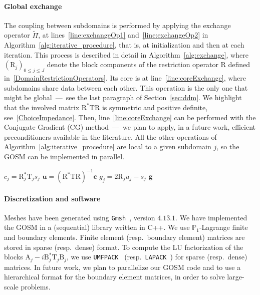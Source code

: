 \documentclass[a4paper,11pt]{article}
\newcommand{\mA}{\mathrm{A}}
\newcommand{\mB}{\mathrm{B}}
\newcommand{\mT}{\mathrm{T}}
\newcommand{\mR}{\mathrm{R}}
\newcommand{\bu}{\boldsymbol{u}}
\newcommand{\bg}{\boldsymbol{g}}
\newcommand{\bs}{\boldsymbol{s}}
\newcommand{\bc}{\boldsymbol{c}}
\begin{document}
\paragraph{Global exchange}

The coupling between subdomains is performed by applying the exchange operator \(\tilde{\Pi}\), at lines~\ref{line:exchangeOp1} and~\ref{line:exchangeOp2} in Algorithm~\ref{alg:iterative_procedure}, that is, at initialization and then at each iteration. This process is described in detail in Algorithm~\ref{alg:exchange}, where \((\mR_j)_{0\le j \le J}\) denote the block components of the restriction operator \(\mR\) defined in~\eqref{DomainRestrictionOperators}. 
Its core is at line~\ref{line:coreExchange}, where subdomains share data between each other. This operation is the only one that might be global~---~see the last paragraph of Section~\ref{sec:ddm}. We highlight that the involved matrix \(\mR^* \mT \mR\) is symmetric and positive definite, see~\eqref{ChoiceImpedance}. Then, line~\ref{line:coreExchange} can be performed with the Conjugate Gradient (CG) method~---~we plan to apply, in a future work, efficient preconditioners available in the literature.
All the other operations of Algorithm~\ref{alg:iterative_procedure} are local to a given subdomain \(j\), so the GOSM can be implemented in parallel. 

\begin{algorithm}[H]
  \caption{Apply \(\tilde{\Pi}\) to a vector \(\bs\)}\label{alg:exchange}
  \begin{algorithmic}[1]
      \State \(c_j = \mR_j^* \mT_j s_j \) 
    \EndFor
    \State \(\bu = \left(\mR^* \mT \mR\right)^{-1} \bc\) \label{line:coreExchange}
      \State \(g_j = 2 \mR_j u_j - s_j\) 
    \EndFor
    \State \Return \(\bg\)
  \end{algorithmic}
\end{algorithm}



\paragraph{Discretization and software}
Meshes have been generated using \texttt{Gmsh}~\cite{GeuzaineRemacle2009G3F}, version \(4.13.1\). We have implemented the GOSM in a (sequential) library written in C++. 
We use $\mathbb{P}_1$-Lagrange finite and boundary elements. Finite element (resp.~boundary element) matrices are stored in sparse (resp.~dense) format. 
To compute the LU factorization of the blocks \(\mA_j -i \mB_j^* \mT_j \mB_j\), we use \texttt{UMFPACK}~\cite{Davis2004A8U} (resp.~\texttt{LAPACK}~\cite{Anderson1999LUG}) for sparse (resp.~dense) matrices. In future work, we plan to parallelize our GOSM code and to use a hierarchical format for the boundary element matrices, in order to solve large-scale problems. 
\end{document}
